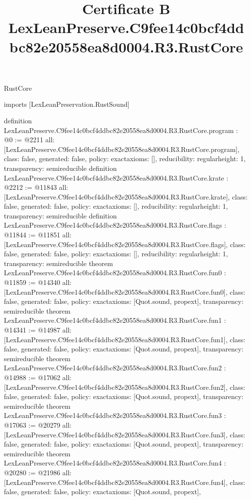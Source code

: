 \begin{lexlean}{RustCore}
\title{Certificate B LexLeanPreserve.C9fee14c0bcf4ddbc82e20558ea8d0004.R3.RustCore}
\begin{coremodule}
imports [LexLeanPreservation.RustSound]

definition LexLeanPreserve.C9fee14c0bcf4ddbc82e20558ea8d0004.R3.RustCore.program : @0 := @2211 {
  all: [LexLeanPreserve.C9fee14c0bcf4ddbc82e20558ea8d0004.R3.RustCore.program],
  class: false,
  generated: false,
  policy: exact{axioms: []},
  reducibility: regular{height: 1},
  transparency: semireducible
}
definition LexLeanPreserve.C9fee14c0bcf4ddbc82e20558ea8d0004.R3.RustCore.krate : @2212 := @11843 {
  all: [LexLeanPreserve.C9fee14c0bcf4ddbc82e20558ea8d0004.R3.RustCore.krate],
  class: false,
  generated: false,
  policy: exact{axioms: []},
  reducibility: regular{height: 1},
  transparency: semireducible
}
definition LexLeanPreserve.C9fee14c0bcf4ddbc82e20558ea8d0004.R3.RustCore.flags : @11844 := @11851 {
  all: [LexLeanPreserve.C9fee14c0bcf4ddbc82e20558ea8d0004.R3.RustCore.flags],
  class: false,
  generated: false,
  policy: exact{axioms: []},
  reducibility: regular{height: 1},
  transparency: semireducible
}
theorem LexLeanPreserve.C9fee14c0bcf4ddbc82e20558ea8d0004.R3.RustCore.fun0 : @11859 := @14340 {
  all: [LexLeanPreserve.C9fee14c0bcf4ddbc82e20558ea8d0004.R3.RustCore.fun0],
  class: false,
  generated: false,
  policy: exact{axioms: [Quot.sound, propext]},
  transparency: semireducible
}
theorem LexLeanPreserve.C9fee14c0bcf4ddbc82e20558ea8d0004.R3.RustCore.fun1 : @14341 := @14987 {
  all: [LexLeanPreserve.C9fee14c0bcf4ddbc82e20558ea8d0004.R3.RustCore.fun1],
  class: false,
  generated: false,
  policy: exact{axioms: [Quot.sound, propext]},
  transparency: semireducible
}
theorem LexLeanPreserve.C9fee14c0bcf4ddbc82e20558ea8d0004.R3.RustCore.fun2 : @14988 := @17062 {
  all: [LexLeanPreserve.C9fee14c0bcf4ddbc82e20558ea8d0004.R3.RustCore.fun2],
  class: false,
  generated: false,
  policy: exact{axioms: [Quot.sound, propext]},
  transparency: semireducible
}
theorem LexLeanPreserve.C9fee14c0bcf4ddbc82e20558ea8d0004.R3.RustCore.fun3 : @17063 := @20279 {
  all: [LexLeanPreserve.C9fee14c0bcf4ddbc82e20558ea8d0004.R3.RustCore.fun3],
  class: false,
  generated: false,
  policy: exact{axioms: [Quot.sound, propext]},
  transparency: semireducible
}
theorem LexLeanPreserve.C9fee14c0bcf4ddbc82e20558ea8d0004.R3.RustCore.fun4 : @20280 := @21986 {
  all: [LexLeanPreserve.C9fee14c0bcf4ddbc82e20558ea8d0004.R3.RustCore.fun4],
  class: false,
  generated: false,
  policy: exact{axioms: [Quot.sound, propext]},
}
\end{coremodule}
\end{lexlean}
